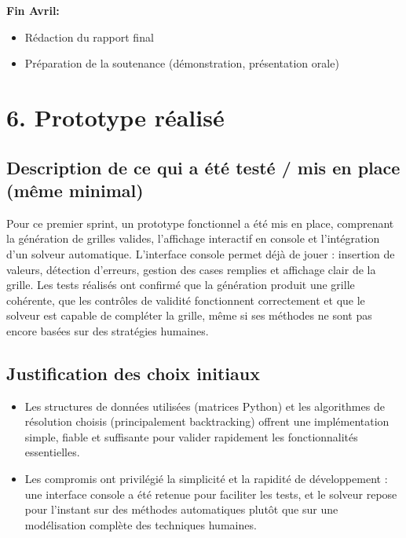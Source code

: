 \documentclass[a4paper]{article}
\begin{document}
\textbf{Fin Avril:}
\begin{itemize}
  \item Rédaction du rapport final
  \item Préparation de la soutenance (démonstration, présentation orale)
\end{itemize}

\section*{6. Prototype réalisé}

\subsection*{Description de ce qui a été testé / mis en place (même minimal)}

Pour ce premier sprint, un prototype fonctionnel a été mis en place, comprenant la génération de grilles valides, l’affichage interactif en console et l’intégration d’un solveur automatique. L’interface console permet déjà de jouer : insertion de valeurs, détection d’erreurs, gestion des cases remplies et affichage clair de la grille.  
Les tests réalisés ont confirmé que la génération produit une grille cohérente, que les contrôles de validité fonctionnent correctement et que le solveur est capable de compléter la grille, même si ses méthodes ne sont pas encore basées sur des stratégies humaines.

\subsection*{Justification des choix initiaux}
\begin{itemize}
  \item Les structures de données utilisées (matrices Python) et les algorithmes de résolution choisis (principalement backtracking) offrent une implémentation simple, fiable et suffisante pour valider rapidement les fonctionnalités essentielles.
  \item Les compromis ont privilégié la simplicité et la rapidité de développement : une interface console a été retenue pour faciliter les tests, et le solveur repose pour l’instant sur des méthodes automatiques plutôt que sur une modélisation complète des techniques humaines.
\end{itemize}
\end{document}
